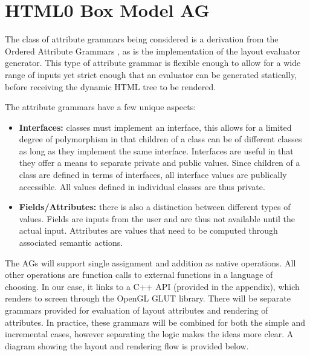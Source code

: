 \documentclass[11pt]{article}
\begin{document}
\section{HTML0 Box Model AG}

The class of attribute grammars being considered is a derivation from the Ordered Attribute Grammars \cite{Kastens}, as is the implementation of the layout evaluator generator. This type of attribute grammar is flexible enough to allow for a wide range of inputs yet strict enough that an evaluator can be generated statically, before receiving the dynamic HTML tree to be rendered.

The attribute grammars have a few unique aspects:
\begin{itemize}
\item {\bf Interfaces:} classes must implement an interface, this allows for a limited degree of polymorphism in that children of a class can be of different classes as long as they implement the same interface. Interfaces are useful in that they offer a means to separate private and public values. Since children of a class are defined in terms of interfaces, all interface values are publically accessible. All values defined in individual classes are thus private.
\item {\bf Fields/Attributes:} there is also a distinction between different types of values. Fields are inputs from the user and are thus not available until the actual input. Attributes are values that need to be computed through associated semantic actions.
\end{itemize}

The AGs will support single assignment and addition as native operations. All other operations are function calls to external functions in a language of choosing. In our case, it links to a C++ API (provided in the appendix), which renders to screen through the OpenGL GLUT library. There will be separate grammars provided for evaluation of layout attributes and rendering of attributes. In practice, these grammars will be combined for both the simple and incremental cases, however separating the logic makes the ideas more clear. A diagram showing the layout and rendering flow is provided below.

\begin{center} \setlength\fboxsep{0pt}
\setlength\fboxrule{0.5pt}
\end{center}
\end{document}
